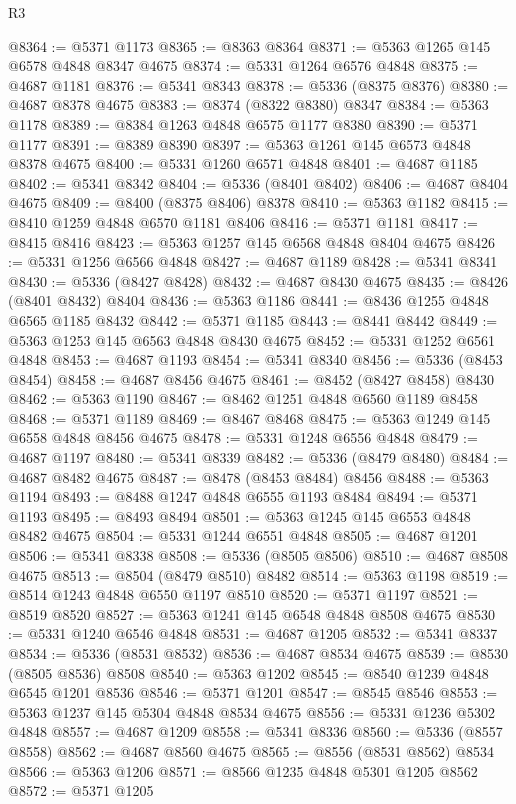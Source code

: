 \begin{lexlean}{R3}
\begin{coremodule}
@8364 := @5371 @1173
@8365 := @8363 @8364
@8371 := @5363 @1265 @145 @6578 @4848 @8347 @4675
@8374 := @5331 @1264 @6576 @4848
@8375 := @4687 @1181
@8376 := @5341 @8343
@8378 := @5336 (@8375 @8376)
@8380 := @4687 @8378 @4675
@8383 := @8374 (@8322 @8380) @8347
@8384 := @5363 @1178
@8389 := @8384 @1263 @4848 @6575 @1177 @8380
@8390 := @5371 @1177
@8391 := @8389 @8390
@8397 := @5363 @1261 @145 @6573 @4848 @8378 @4675
@8400 := @5331 @1260 @6571 @4848
@8401 := @4687 @1185
@8402 := @5341 @8342
@8404 := @5336 (@8401 @8402)
@8406 := @4687 @8404 @4675
@8409 := @8400 (@8375 @8406) @8378
@8410 := @5363 @1182
@8415 := @8410 @1259 @4848 @6570 @1181 @8406
@8416 := @5371 @1181
@8417 := @8415 @8416
@8423 := @5363 @1257 @145 @6568 @4848 @8404 @4675
@8426 := @5331 @1256 @6566 @4848
@8427 := @4687 @1189
@8428 := @5341 @8341
@8430 := @5336 (@8427 @8428)
@8432 := @4687 @8430 @4675
@8435 := @8426 (@8401 @8432) @8404
@8436 := @5363 @1186
@8441 := @8436 @1255 @4848 @6565 @1185 @8432
@8442 := @5371 @1185
@8443 := @8441 @8442
@8449 := @5363 @1253 @145 @6563 @4848 @8430 @4675
@8452 := @5331 @1252 @6561 @4848
@8453 := @4687 @1193
@8454 := @5341 @8340
@8456 := @5336 (@8453 @8454)
@8458 := @4687 @8456 @4675
@8461 := @8452 (@8427 @8458) @8430
@8462 := @5363 @1190
@8467 := @8462 @1251 @4848 @6560 @1189 @8458
@8468 := @5371 @1189
@8469 := @8467 @8468
@8475 := @5363 @1249 @145 @6558 @4848 @8456 @4675
@8478 := @5331 @1248 @6556 @4848
@8479 := @4687 @1197
@8480 := @5341 @8339
@8482 := @5336 (@8479 @8480)
@8484 := @4687 @8482 @4675
@8487 := @8478 (@8453 @8484) @8456
@8488 := @5363 @1194
@8493 := @8488 @1247 @4848 @6555 @1193 @8484
@8494 := @5371 @1193
@8495 := @8493 @8494
@8501 := @5363 @1245 @145 @6553 @4848 @8482 @4675
@8504 := @5331 @1244 @6551 @4848
@8505 := @4687 @1201
@8506 := @5341 @8338
@8508 := @5336 (@8505 @8506)
@8510 := @4687 @8508 @4675
@8513 := @8504 (@8479 @8510) @8482
@8514 := @5363 @1198
@8519 := @8514 @1243 @4848 @6550 @1197 @8510
@8520 := @5371 @1197
@8521 := @8519 @8520
@8527 := @5363 @1241 @145 @6548 @4848 @8508 @4675
@8530 := @5331 @1240 @6546 @4848
@8531 := @4687 @1205
@8532 := @5341 @8337
@8534 := @5336 (@8531 @8532)
@8536 := @4687 @8534 @4675
@8539 := @8530 (@8505 @8536) @8508
@8540 := @5363 @1202
@8545 := @8540 @1239 @4848 @6545 @1201 @8536
@8546 := @5371 @1201
@8547 := @8545 @8546
@8553 := @5363 @1237 @145 @5304 @4848 @8534 @4675
@8556 := @5331 @1236 @5302 @4848
@8557 := @4687 @1209
@8558 := @5341 @8336
@8560 := @5336 (@8557 @8558)
@8562 := @4687 @8560 @4675
@8565 := @8556 (@8531 @8562) @8534
@8566 := @5363 @1206
@8571 := @8566 @1235 @4848 @5301 @1205 @8562
@8572 := @5371 @1205

\end{coremodule}
\end{lexlean}
